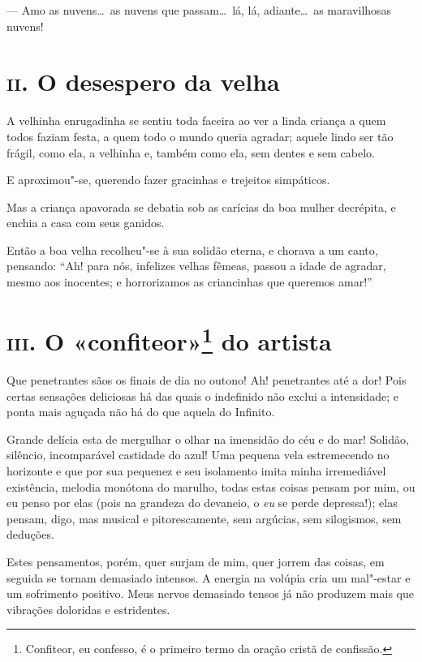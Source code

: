 --- Amo as nuvens\ldots\  as nuvens que passam\ldots\  lá, lá, adiante\ldots\  as
maravilhosas nuvens!

\chapter{\textsc{ii.} O desespero da velha}

A velhinha enrugadinha se sentiu toda faceira ao ver a linda criança a
quem todos faziam festa, a quem todo o mundo queria agradar; aquele lindo
ser tão frágil, como ela, a velhinha e, também como ela, sem dentes e
sem cabelo.

E aproximou"-se, querendo fazer gracinhas e trejeitos
simpáticos.

Mas a criança apavorada se debatia sob as carícias da boa mulher
decrépita, e enchia a casa com seus ganidos.

Então a boa velha recolheu"-se à sua solidão eterna, e chorava a um
canto, pensando: “Ah! para nós, infelizes velhas fêmeas,
passou a idade de agradar, mesmo aos inocentes; e horrorizamos as
criancinhas que queremos amar!”

\chapter{\textsc{iii.} O «confiteor»\footnote[*]{Confiteor, eu confesso, é o primeiro termo da oração cristã de confissão.} do artista}

Que penetrantes sãos os finais de dia no outono! Ah! penetrantes até a
dor! Pois certas sensações deliciosas há das quais o indefinido não
exclui a intensidade; e ponta mais aguçada não há do que aquela do
Infinito.

Grande delícia esta de mergulhar o olhar na imensidão do céu e do mar!
Solidão, silêncio, incomparável castidade do azul! Uma pequena vela
estremecendo no horizonte e que por sua pequenez e seu isolamento
imita minha irremediável existência, melodia monótona do marulho, todas
estas coisas pensam por mim, ou eu penso por elas (pois na grandeza do
devaneio, o \textit{eu} se perde depressa!); elas pensam, digo, mas musical e
pitorescamente, sem argúcias, sem silogismos, sem deduções.

Estes pensamentos, porém, quer surjam de mim, quer jorrem das
coisas, em seguida se tornam demasiado intensos. A energia na volúpia cria
um mal"-estar e um sofrimento positivo. Meus nervos demasiado tensos
já não produzem mais que vibrações doloridas e estridentes.

